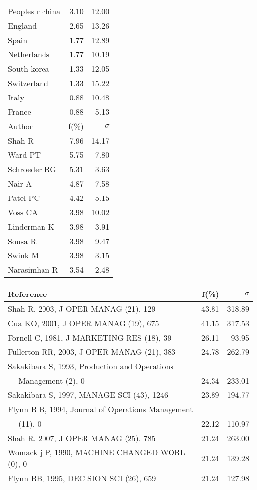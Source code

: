 \documentclass[a4paper,11pt]{report}
\begin{document}
\begin{landscape}
\begin{table}[!ht]
{\begin{tabular}{|l r r|}
Peoples r china & 3.10 & 12.00\\
England & 2.65 & 13.26\\
Spain & 1.77 & 12.89\\
Netherlands & 1.77 & 10.19\\
South korea & 1.33 & 12.05\\
Switzerland & 1.33 & 15.22\\
Italy & 0.88 & 10.48\\
France & 0.88 & 5.13\\
\hline
\hline
Author & f(\%) & $\sigma$\\
\hline
Shah R & 7.96 & 14.17\\
Ward PT & 5.75 & 7.80\\
Schroeder RG & 5.31 & 3.63\\
Nair A & 4.87 & 7.58\\
Patel PC & 4.42 & 5.15\\
Voss CA & 3.98 & 10.02\\
Linderman K & 3.98 & 3.91\\
Sousa R & 3.98 & 9.47\\
Swink M & 3.98 & 3.15\\
Narasimhan R & 3.54 & 2.48\\
\hline
\end{tabular}
}
{\scriptsize\begin{tabular}{|l r r|}
\hline
Reference & f(\%) & $\sigma$\\
\hline
Shah R, 2003, J OPER MANAG (21), 129 & 43.81 & 318.89\\
Cua KO, 2001, J OPER MANAG (19), 675 & 41.15 & 317.53\\
Fornell C, 1981, J MARKETING RES (18), 39 & 26.11 & 93.95\\
Fullerton RR, 2003, J OPER MANAG (21), 383 & 24.78 & 262.79\\
Sakakibara S, 1993, Production and Operations &  & \\
$\quad$ Management (2), 0 & 24.34 & 233.01\\
Sakakibara S, 1997, MANAGE SCI (43), 1246 & 23.89 & 194.77\\
Flynn B B, 1994, Journal of Operations Management &  & \\
$\quad$ (11), 0 & 22.12 & 110.97\\
Shah R, 2007, J OPER MANAG (25), 785 & 21.24 & 263.00\\
Womack j P, 1990, MACHINE CHANGED WORL (0), 0 & 21.24 & 139.28\\
Flynn BB, 1995, DECISION SCI (26), 659 & 21.24 & 127.98\\

\end{tabular}}
\end{table}
\end{landscape}
\end{document}
